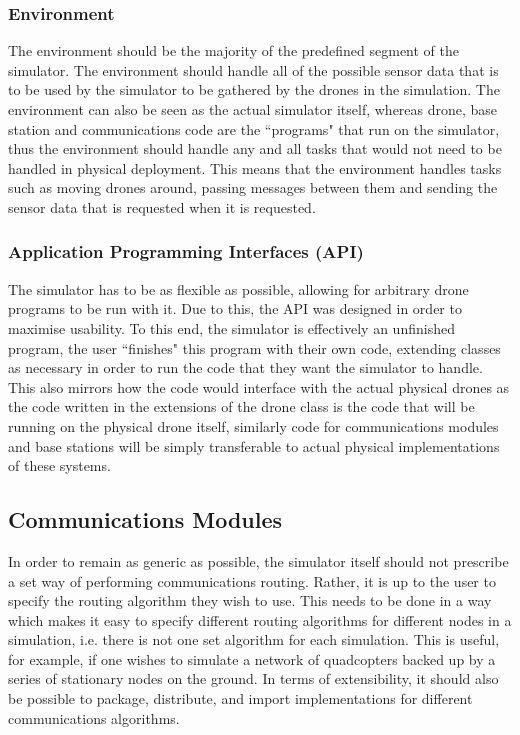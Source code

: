 		\subsubsection{Environment}
			The environment should be the majority of the predefined segment of the simulator. The environment should handle all of the possible
			sensor data that is to be used by the simulator to be gathered by the drones in the simulation. The environment can also be seen as the
			actual simulator itself, whereas drone, base station and communications code are the ``programs" that run on the simulator, thus the
			environment should handle any and all tasks that would not need to be handled in physical deployment. This means that the environment
			handles tasks such as moving drones around, passing messages between them and sending the sensor data that is requested when it is
			requested.

		\subsubsection{Application Programming Interfaces (API)}
			The simulator has to be as flexible as possible, allowing for arbitrary drone programs to be run with it. Due to this, the API was designed
			in order to maximise usability. To this end, the simulator is effectively an unfinished program, the user ``finishes" this program with their
			own code, extending classes as necessary in order to run the code that they want the simulator to handle. This also mirrors how the code would
			interface with the actual physical drones as the code written in the extensions of the drone class is the code that will be running on the
			physical drone itself, similarly code for communications modules and base stations will be simply transferable to actual physical implementations
			of these systems.

\subsection{Communications Modules}
In order to remain as generic as possible, the simulator itself should not prescribe a set way of performing communications routing. Rather, it is up to the user to specify the routing algorithm they wish to use. This needs to be done in a way which makes it easy to specify different routing algorithms for different nodes in a simulation, i.e. there is not one set algorithm for each simulation. This is useful, for example, if one wishes to simulate a network of quadcopters backed up by a series of stationary nodes on the ground. In terms of extensibility, it should also be possible to package, distribute, and import implementations for different communications algorithms.

